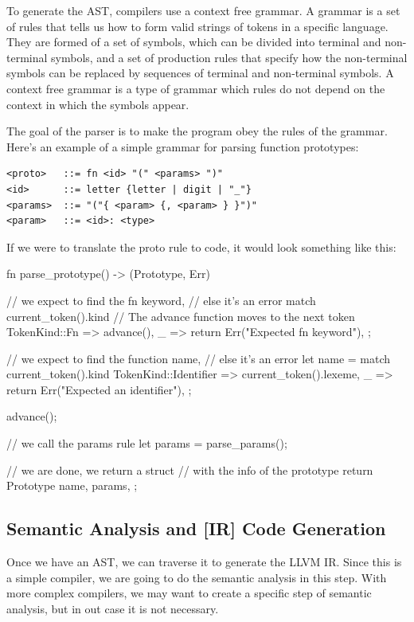 ﻿\documentclass[10pt,a4paper,twocolumn,twoside]{article}
\begin{document}
To generate the AST, compilers use a context free grammar. A grammar is a set of
rules that tells us how to form valid strings of tokens in a specific language.
They are formed of a set of symbols, which can be divided into terminal and
non-terminal symbols, and a set of production rules that specify how the
non-terminal symbols can be replaced by sequences of terminal and non-terminal
symbols. A context free grammar is a type of grammar which rules do not depend
on the context in which the symbols appear.

The goal of the parser is to make the program obey the rules of the grammar.
Here's an example of a simple grammar for parsing function prototypes:

\begin{small}
\begin{verbatim}
<proto>   ::= fn <id> "(" <params> ")"
<id>      ::= letter {letter | digit | "_"}
<params>  ::= "("{ <param> {, <param> } }")"
<param>   ::= <id>: <type>
\end{verbatim}
\end{small}

If we were to translate the proto rule to code, it would look something like 
this:

\begin{code}
fn parse_prototype() -> (Prototype, Err) {
    // we expect to find the fn keyword,
    // else it's an error
    match current_token().kind {
        // The advance function moves to the next token
        TokenKind::Fn => advance(),
        _ => return Err("Expected fn keyword"),
    };

    // we expect to find the function name,
    // else it's an error
    let name = match current_token().kind {
        TokenKind::Identifier => current_token().lexeme,
        _ => return Err("Expected an identifier"),
    };

    advance();

    // we call the params rule
    let params = parse_params();

    // we are done, we return a struct 
    // with the info of the prototype
    return Prototype { 
        name,
        params,
    };
}
\end{code}

\subsection{Semantic Analysis and [IR] Code Generation}
Once we have an AST, we can traverse it to generate the LLVM IR. Since this is a
simple compiler, we are going to do the semantic analysis in this step. With 
more complex compilers, we may want to create a specific step of semantic 
analysis, but in out case it is not necessary.
\end{document}
